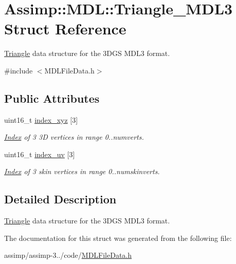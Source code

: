 \hypertarget{struct_assimp_1_1_m_d_l_1_1_triangle___m_d_l3}{\section{Assimp\+:\+:M\+D\+L\+:\+:Triangle\+\_\+\+M\+D\+L3 Struct Reference}
\label{struct_assimp_1_1_m_d_l_1_1_triangle___m_d_l3}
}


\hyperlink{struct_assimp_1_1_m_d_l_1_1_triangle}{Triangle} data structure for the 3\+D\+G\+S M\+D\+L3 format.  




{\ttfamily \#include $<$M\+D\+L\+File\+Data.\+h$>$}

\subsection*{Public Attributes}
\begin{DoxyCompactItemize}
\item 
\hypertarget{struct_assimp_1_1_m_d_l_1_1_triangle___m_d_l3_ad29223a487091cd5a3185776eeedc4e3}{uint16\+\_\+t \hyperlink{struct_assimp_1_1_m_d_l_1_1_triangle___m_d_l3_ad29223a487091cd5a3185776eeedc4e3}{index\+\_\+xyz} \mbox{[}3\mbox{]}}\label{struct_assimp_1_1_m_d_l_1_1_triangle___m_d_l3_ad29223a487091cd5a3185776eeedc4e3}

\begin{DoxyCompactList}\small\item\em \hyperlink{struct_index}{Index} of 3 3\+D vertices in range 0..numverts. \end{DoxyCompactList}\item 
\hypertarget{struct_assimp_1_1_m_d_l_1_1_triangle___m_d_l3_aaf32484dc535b7511e30d287f9ccf482}{uint16\+\_\+t \hyperlink{struct_assimp_1_1_m_d_l_1_1_triangle___m_d_l3_aaf32484dc535b7511e30d287f9ccf482}{index\+\_\+uv} \mbox{[}3\mbox{]}}\label{struct_assimp_1_1_m_d_l_1_1_triangle___m_d_l3_aaf32484dc535b7511e30d287f9ccf482}

\begin{DoxyCompactList}\small\item\em \hyperlink{struct_index}{Index} of 3 skin vertices in range 0..numskinverts. \end{DoxyCompactList}\end{DoxyCompactItemize}


\subsection{Detailed Description}
\hyperlink{struct_assimp_1_1_m_d_l_1_1_triangle}{Triangle} data structure for the 3\+D\+G\+S M\+D\+L3 format. 

The documentation for this struct was generated from the following file\+:\begin{DoxyCompactItemize}
\item 
assimp/assimp-\/3../code/\hyperlink{_m_d_l_file_data_8h}{M\+D\+L\+File\+Data.\+h}\end{DoxyCompactItemize}
